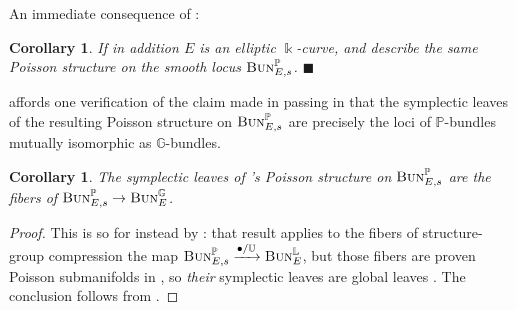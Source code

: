 \documentclass[11pt,leqno]{article}
\theoremstyle{plain}
\newtheorem{corollary}[lemma]{Corollary}
\theoremstyle{plain}
\theoremstyle{plain}
\numberwithin{equation}{section}
\theoremstyle{nonumberplain}
\newtheorem{proof}{Proof}
\newcommand\bG{{\mathbb G}}
\newcommand\bL{{\mathbb L}}
\newcommand\bP{{\mathbb P}}
\newcommand\bU{{\mathbb U}}
\newcommand\1{{\bf 1}}
\newcommand{\cat}[1]{\textsc{#1}}
\newcommand{\qedhere}{\mbox{}\hfill\ensuremath{\blacksquare}}
\begin{document}
An immediate consequence of :

\begin{corollary}\label{cor:hence.ell.curve}
  If in addition $E$ is an elliptic $\Bbbk$-curve,  and  describe the same Poisson structure on the smooth locus $\cat{Bun}_{E,s}^{\bP}$.  \qedhere
\end{corollary}

 affords one verification of the claim made in passing in \cite[discussion post Theorem 1, p.67]{FO98} that the symplectic leaves of the resulting Poisson structure on $\cat{Bun}_{E,s}^{\bP}$ are precisely the loci of $\bP$-bundles mutually isomorphic as $\bG$-bundles. 

\begin{corollary}\label{cor:fo.parab.sympl.lvs}
  The symplectic leaves of 's Poisson structure on $\cat{Bun}_{E,s}^{\bP}$ are the fibers of $\cat{Bun}_{E,s}^{\bP}\to \cat{Bun}_{E}^{\bG}$. 
\end{corollary}
\begin{proof}
  This is so for  instead by \cite[Corollary 3.7]{MR2396472}: that result applies to the fibers of structure-group compression the map $\cat{Bun}^{\bP}_{E,s}\xrightarrow{\bullet/\bU}\cat{Bun}^{\bL}_E$, but those fibers are proven Poisson submanifolds in \cite[Lemma 3.4]{MR2396472}, so \emph{their} symplectic leaves are global leaves \cite[Proposition 8.2]{cfm_lec-poiss_2021}. The conclusion follows from .
\end{proof}


%
\end{document}
